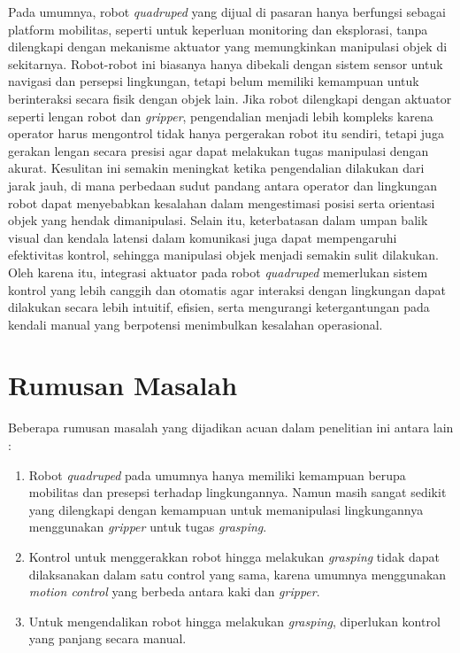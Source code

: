 Pada umumnya, robot \emph{quadruped} yang dijual di pasaran hanya berfungsi sebagai platform mobilitas,
seperti untuk keperluan monitoring dan eksplorasi, tanpa dilengkapi dengan mekanisme aktuator
yang memungkinkan manipulasi objek di sekitarnya. Robot-robot ini biasanya hanya dibekali
dengan sistem sensor untuk navigasi dan persepsi lingkungan, tetapi belum memiliki kemampuan
untuk berinteraksi secara fisik dengan objek lain. Jika robot dilengkapi dengan aktuator
seperti lengan robot dan \emph{gripper}, pengendalian menjadi lebih kompleks karena operator harus
mengontrol tidak hanya pergerakan robot itu sendiri, tetapi juga gerakan lengan secara presisi
agar dapat melakukan tugas manipulasi dengan akurat. Kesulitan ini semakin meningkat ketika
pengendalian dilakukan dari jarak jauh, di mana perbedaan sudut pandang
antara operator dan lingkungan robot dapat menyebabkan kesalahan dalam mengestimasi posisi serta
orientasi objek yang hendak dimanipulasi. Selain itu, keterbatasan dalam umpan balik visual
dan kendala latensi dalam komunikasi juga dapat mempengaruhi efektivitas kontrol,
sehingga manipulasi objek menjadi semakin sulit dilakukan. Oleh karena itu, integrasi aktuator
pada robot \emph{quadruped} memerlukan sistem kontrol yang lebih canggih dan otomatis agar
interaksi dengan lingkungan dapat dilakukan secara lebih intuitif, efisien, serta
mengurangi ketergantungan pada kendali manual yang berpotensi menimbulkan kesalahan operasional.

\section{Rumusan Masalah}

Beberapa rumusan masalah yang dijadikan acuan dalam penelitian ini antara lain :

\begin{enumerate}
    \item Robot \emph{quadruped} pada umumnya hanya memiliki kemampuan berupa mobilitas
    dan presepsi terhadap lingkungannya. Namun masih sangat sedikit yang dilengkapi
    dengan kemampuan untuk memanipulasi lingkungannya menggunakan \emph{gripper} untuk tugas \emph{grasping}.
    \item Kontrol untuk menggerakkan robot hingga melakukan \emph{grasping} tidak dapat dilaksanakan dalam
    satu control yang sama, karena umumnya menggunakan \emph{motion control} yang berbeda antara kaki dan \emph{gripper}.
    \item Untuk mengendalikan robot hingga melakukan \emph{grasping}, diperlukan kontrol yang panjang secara manual.

\end{enumerate}

